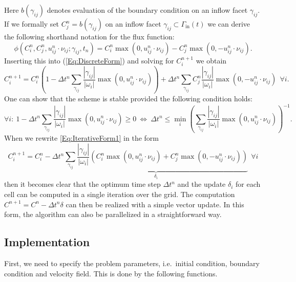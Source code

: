 \documentclass[11pt,a4paper,headinclude,footinclude,DIV16,normalheadings]{scrreprt}
\begin{document}
Here $b(\gamma_{ij})$ denotes evaluation of the boundary condition on
an inflow facet $\gamma_{ij}$. If we formally set
$C_j^n=b(\gamma_{ij})$ on an inflow facet $\gamma_{ij} \subset
\Gamma_{\text{in}}(t)$ we can derive the following shorthand notation
for the flux function:
\begin{equation}
\phi(C_i^n, C_j^n, u_{ij}^n\cdot\nu_{ij}; \gamma_{ij}, t_n ) = C_i^n
\max(0,u_{ij}^n\cdot\nu_{ij}) - C_j^n \max(0,-u_{ij}^n\cdot\nu_{ij}).
\end{equation}
Inserting this into (\ref{Eq:DiscreteForm}) and solving for
$C_i^{n+1}$ we obtain
\begin{equation}
C_i^{n+1} = C_i^n\left(1-\Delta t^n \sum\limits_{\gamma_{ij}}
  \frac{|\gamma_{ij}|}{|\omega_i|}
  \max(0,u_{ij}^n\cdot\nu_{ij})\right) + \Delta t^n
\sum\limits_{\gamma_{ij}} C_j^n  \frac{|\gamma_{ij}|}{|\omega_i|}
\max(0,-u_{ij}^n\cdot\nu_{ij}) \ \ \forall i.
\label{Eq:IterativeForm1}
\end{equation}
One can show that the scheme is stable provided the following condition holds:
\begin{equation}
\forall i:\ 1-\Delta t^n \sum\limits_{\gamma_{ij}}
  \frac{|\gamma_{ij}|}{|\omega_i|}
  \max(0,u_{ij}^n\cdot\nu_{ij})\geq 0 \ \Leftrightarrow\ \Delta
  t^n\leq  \min_i \left(\sum\limits_{\gamma_{ij}}
  \frac{|\gamma_{ij}|}{|\omega_i|}
  \max(0,u_{ij}^n\cdot\nu_{ij})\right)^{-1}.
\label{Eq:TimeStepControl}
\end{equation}
When we rewrite \ref{Eq:IterativeForm1} in the form 
\begin{equation}
C_i^{n+1} = C_i^n - \Delta t^n
  \underbrace{\sum\limits_{\gamma_{ij}} \frac{|\gamma_{ij}|}{|\omega_i|}
  \left( C_i^n \max(0,u_{ij}^n\cdot\nu_{ij}) + 
         C_j^n \max(0,-u_{ij}^n\cdot\nu_{ij})\right)}_{\delta_i} \ \ \forall i
\label{Eq:IterativeForm2}
\end{equation}
then it becomes clear that the optimum time step $\Delta t^n$ and the
update $\delta_i$ for each cell can be computed in a single iteration
over the grid. The computation $C^{n+1} = C^n - \Delta t^n \delta$ can then
be realized with a simple vector update. In this form, the algorithm
can also be parallelized in a straightforward way.


\subsection{Implementation}

First, we need to specify the problem parameters, i.e.~initial
condition, boundary condition and velocity field. This is done by the
following functions.
\end{document}
